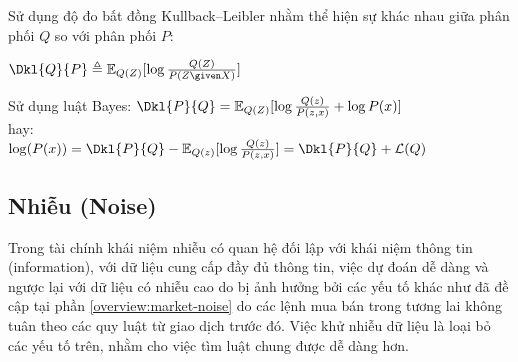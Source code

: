 Sử dụng độ đo bất đồng Kullback–Leibler nhằm thể hiện sự khác nhau giữa phân phối $Q$ so với phân phối $P$: 


$\Dkl{Q}{P} \triangleq  \mathbb{E}_{Q(Z)} [\log \frac{Q(Z)}{P(Z \given X)}]$

Sử dụng luật Bayes:
$\Dkl{P}{Q} = \mathbb{E}_{Q(Z)} [\log \frac{Q(z)}{P(z , x)}  + \log P(x)]$\\
hay:\\
$\log(P(x)) = \Dkl{P}{Q} - \mathbb{E}_{Q(z)} [\log \frac{Q(z)}{P(z , x)}]
= \Dkl{P}{Q} + \mathcal{L}(Q)
$
\subsection{Nhiễu (Noise)} \label{concept:noise}
Trong tài chính khái niệm nhiễu có quan hệ đối lập với khái niệm thông tin (information), với dữ liệu cung cấp đầy đủ thông tin, việc dự đoán dễ dàng và ngược lại với dữ liệu có nhiễu cao do bị ảnh hưởng bởi các yếu tố khác như đã đề cập tại phần \ref{overview:market-noise} do các lệnh mua bán trong tương lai không tuân theo các quy luật từ giao dịch trước đó. Việc khử nhiễu dữ liệu là loại bỏ các yếu tố trên, nhằm cho việc tìm luật chung được dễ dàng hơn. %